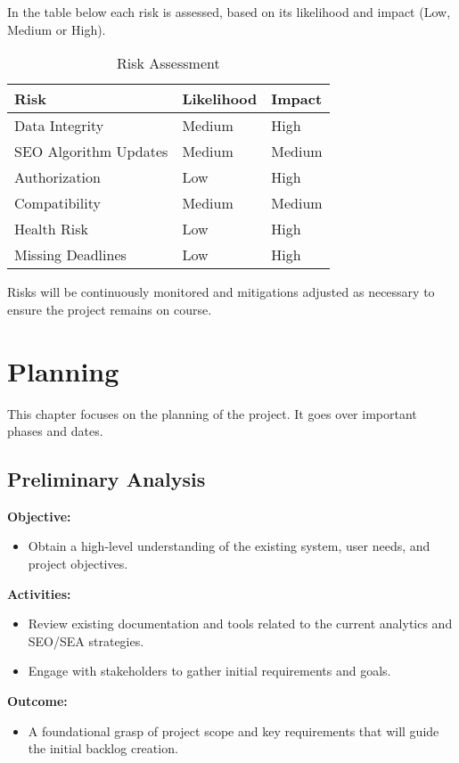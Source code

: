 \documentclass[12pt,a4paper]{article}
\begin{document}
In the table below each risk is assessed, based on its likelihood and impact (Low, Medium or High). 

\begin{table}[h!]
\centering
\begin{tabular}{|l|l|l|}
\hline
\textbf{Risk} & \textbf{Likelihood} & \textbf{Impact} \\ \hline
Data Integrity & Medium & High \\ \hline
SEO Algorithm Updates & Medium & Medium \\ \hline
Authorization & Low & High \\ \hline
Compatibility & Medium & Medium \\ \hline
Health Risk & Low & High \\ \hline
Missing Deadlines & Low & High \\ \hline
\end{tabular}
\caption{Risk Assessment}
\label{table:risk_management}
\end{table}

Risks will be continuously monitored and mitigations adjusted as necessary to ensure the project remains on course.


\newpage
\section{Planning}
This chapter focuses on the planning of the project. It goes over important phases and dates.
\subsection{Preliminary Analysis}

\noindent \textbf{Objective:}
\begin{itemize}
    \item Obtain a high-level understanding of the existing system, user needs, and project objectives.
\end{itemize}

\noindent \textbf{Activities:}
\begin{itemize}
    \item Review existing documentation and tools related to the current analytics and SEO/SEA strategies.
    \item Engage with stakeholders to gather initial requirements and goals.
\end{itemize}

\noindent \textbf{Outcome:}
\begin{itemize}
    \item A foundational grasp of project scope and key requirements that will guide the initial backlog creation.
\end{itemize}
\end{document}
